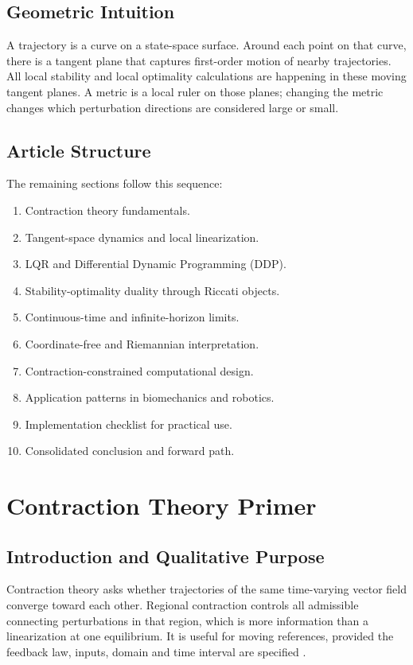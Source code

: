\documentclass[11pt,letterpaper]{article}
\begin{document}
\subsection{Geometric Intuition}
A trajectory is a curve on a state-space surface. Around each point on that curve, there is a tangent plane that captures first-order motion of nearby trajectories. All local stability and local optimality calculations are happening in these moving tangent planes. A metric is a local ruler on those planes; changing the metric changes which perturbation directions are considered large or small.

\subsection{Article Structure}
The remaining sections follow this sequence:
\begin{enumerate}[label=\arabic*.]
\item Contraction theory fundamentals.
\item Tangent-space dynamics and local linearization.
\item LQR and Differential Dynamic Programming (DDP).
\item Stability-optimality duality through Riccati objects.
\item Continuous-time and infinite-horizon limits.
\item Coordinate-free and Riemannian interpretation.
\item Contraction-constrained computational design.
\item Application patterns in biomechanics and robotics.
\item Implementation checklist for practical use.
\item Consolidated conclusion and forward path.
\end{enumerate}

\section{Contraction Theory Primer}

\subsection{Introduction and Qualitative Purpose}
Contraction theory asks whether trajectories of the same time-varying vector field converge toward each other. Regional contraction controls all admissible connecting perturbations in that region, which is more information than a linearization at one equilibrium. It is useful for moving references, provided the feedback law, inputs, domain and time interval are specified \citep{lohmiller1998contraction,forni2014contraction}.
\end{document}
